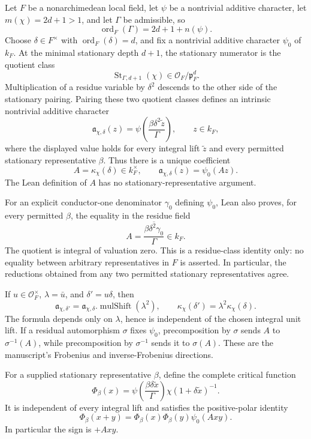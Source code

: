 \begin{lemma}\label{mod:lamprecht-criticalpolarcoordinate}
Let $F$ be a nonarchimedean local field, let $\psi$ be a nontrivial
additive character, let $m(\chi)=2d+1>1$, and let $\Gamma$ be admissible,
so
\[
 \operatorname{ord}_F(\Gamma)=2d+1+n(\psi).
\]
Choose $\delta\in F^\times$ with $\operatorname{ord}_F(\delta)=d$, and
fix a nontrivial additive character $\psi_0$ of $k_F$.  At the minimal
stationary depth $d+1$, the stationary numerator is the quotient class
\[
 \operatorname{St}_{\Gamma,d+1}(\chi)
 \in \mathcal O_F/\mathfrak p_F^d.
\]
Multiplication of a residue variable by $\delta^2$ descends to the other
side of the stationary pairing.  Pairing these two quotient classes defines
an intrinsic nontrivial additive character
\[
 \mathfrak a_{\chi,\delta}(z)
  =\psi\!\left(\frac{\beta\delta^2\widetilde z}{\Gamma}\right),
 \qquad z\in k_F,
\]
where the displayed value holds for every integral lift $\widetilde z$ and
every permitted stationary representative $\beta$.  Thus there is a unique
coefficient
\[
 A=\kappa_\chi(\delta)\in k_F^\times,
 \qquad \mathfrak a_{\chi,\delta}(z)=\psi_0(Az).
\]
The Lean definition of $A$ has no stationary-representative argument.

For an explicit conductor-one denominator $\gamma_0$ defining $\psi_0$,
Lean also proves, for every permitted $\beta$, the equality in the residue
field
\[
 A=
 \overline{\frac{\beta\delta^2\gamma_0}{\Gamma}}\in k_F.
\]
The quotient is integral of valuation zero.  This is a residue-class
identity only: no equality between arbitrary representatives in $F$ is
asserted.  In particular, the reductions obtained from any two permitted
stationary representatives agree.

If $u\in\mathcal O_F^\times$, $\lambda=\bar u$, and
$\delta'=u\delta$, then
\[
 \mathfrak a_{\chi,\delta'}
   =\mathfrak a_{\chi,\delta}.\operatorname{mulShift}(\lambda^2),
 \qquad
 \kappa_\chi(\delta')=\lambda^2\kappa_\chi(\delta).
\]
The formula depends only on $\lambda$, hence is independent of the chosen
integral unit lift.  If a residual automorphism $\sigma$ fixes $\psi_0$,
precomposition by $\sigma$ sends $A$ to $\sigma^{-1}(A)$, while
precomposition by $\sigma^{-1}$ sends it to $\sigma(A)$.  These are the
manuscript's Frobenius and inverse-Frobenius directions.

For a supplied stationary representative $\beta$, define the complete
critical function
\[
 \Phi_\beta(x)=
 \psi\!\left(\frac{\beta\delta\widetilde x}{\Gamma}\right)
 \chi(1+\delta\widetilde x)^{-1}.
\]
It is independent of every integral lift and satisfies the positive-polar
identity
\[
 \Phi_\beta(x+y)
 =\Phi_\beta(x)\Phi_\beta(y)\psi_0(Axy).
\]
In particular the sign is $+Axy$.


\end{lemma}
